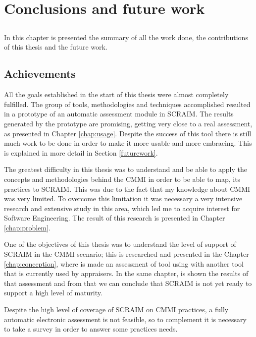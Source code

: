\chapter{Conclusions and future work} \label{chap:conclusion}

\section*{}
In this chapter is presented the summary of all the work done, the contributions of this thesis  and the future work.

\section{Achievements}

All the goals established in the start of this thesis were almost completely fulfilled. The group of tools, methodologies and techniques accomplished resulted in a prototype of an automatic assessment module in SCRAIM. The results generated by the prototype are promising, getting very close to a real assessment, as presented in Chapter \ref{chap:usage}. Despite the success of this tool there is still much work to be done in order to make it more usable and more embracing. This is explained in more detail in Section \ref{futurework}.

The greatest difficulty in this thesis was to understand and be able to apply the concepts and methodologies behind the CMMI in order to be able to map, its practices to SCRAIM. This was due to the fact that my knowledge about CMMI was very limited. To overcome this limitation it was necessary a very intensive research and extensive study in this area, which led me to acquire interest for Software Engineering. The result of this research is presented in Chapter \ref{chap:problem}.

One of the objectives of this thesis was to understand the level of support of SCRAIM in the CMMI scenario; this is researched and presented in the Chapter \ref{chap:conception}, where is made an assessment of tool using with another tool that is currently used by appraisers. In the same chapter, is shown the results of that assessment and from that we can conclude that SCRAIM is not yet ready to support a high level of maturity.

Despite the high level of coverage of SCRAIM on CMMI practices, a fully automatic electronic assessment is not feasible, so to complement it is necessary to take a survey in order to answer some practices needs. 

